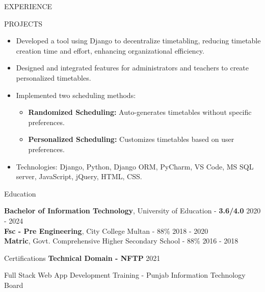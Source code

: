 \documentclass{resume} %
\begin{document}
\begin{rSection}{EXPERIENCE}
\begin{rSection}{PROJECTS}
 
 \begin{itemize}
 	\item Developed a tool using Django to decentralize timetabling, reducing timetable creation time and effort, enhancing organizational efficiency.
 	\item Designed and integrated features for administrators and teachers to create personalized timetables.
 	\item Implemented two scheduling methods:
 	\begin{itemize}
 		\item \textbf{Randomized Scheduling:} Auto-generates timetables without specific preferences.
 		\item \textbf{Personalized Scheduling:} Customizes timetables based on user preferences.
 	\end{itemize}

 	\item Technologies: Django, Python, Django ORM, PyCharm, VS Code, MS SQL server, JavaScript, jQuery, HTML, CSS.
 \end{itemize}
\fi
\end{rSection} 
\end{rSection} 

\begin{rSection}{Education}
	
	
	{\bf Bachelor of Information Technology}, University of Education - {\bf 3.6/4.0 }\hfill {2020 - 2024} 
	\\
	{\bf Fsc  - Pre Engineering}, City College Multan - 88\% \hfill {2018 - 2020}
	\\
	{\bf Matric}, Govt. Comprehensive Higher Secondary School - 88\% \hfill {2016 - 2018}
	
	
\end{rSection}

\begin{rSection}{Certifications} 
	\textbf{Technical Domain - NFTP} \hfill 2021 
    \item {Full Stack Web App Development Training - Punjab Information Technology
    Board}



\end{rSection}

\end{document}
